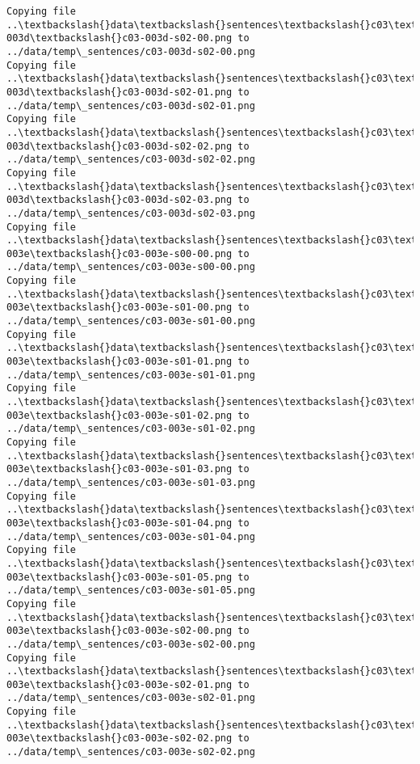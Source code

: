 \documentclass[11pt]{article}
\begin{document}
\begin{Verbatim}[commandchars=\\\{\}]
Copying file ..\textbackslash{}data\textbackslash{}sentences\textbackslash{}c03\textbackslash{}c03-003d\textbackslash{}c03-003d-s02-00.png to
../data/temp\_sentences/c03-003d-s02-00.png
Copying file ..\textbackslash{}data\textbackslash{}sentences\textbackslash{}c03\textbackslash{}c03-003d\textbackslash{}c03-003d-s02-01.png to
../data/temp\_sentences/c03-003d-s02-01.png
Copying file ..\textbackslash{}data\textbackslash{}sentences\textbackslash{}c03\textbackslash{}c03-003d\textbackslash{}c03-003d-s02-02.png to
../data/temp\_sentences/c03-003d-s02-02.png
Copying file ..\textbackslash{}data\textbackslash{}sentences\textbackslash{}c03\textbackslash{}c03-003d\textbackslash{}c03-003d-s02-03.png to
../data/temp\_sentences/c03-003d-s02-03.png
Copying file ..\textbackslash{}data\textbackslash{}sentences\textbackslash{}c03\textbackslash{}c03-003e\textbackslash{}c03-003e-s00-00.png to
../data/temp\_sentences/c03-003e-s00-00.png
Copying file ..\textbackslash{}data\textbackslash{}sentences\textbackslash{}c03\textbackslash{}c03-003e\textbackslash{}c03-003e-s01-00.png to
../data/temp\_sentences/c03-003e-s01-00.png
Copying file ..\textbackslash{}data\textbackslash{}sentences\textbackslash{}c03\textbackslash{}c03-003e\textbackslash{}c03-003e-s01-01.png to
../data/temp\_sentences/c03-003e-s01-01.png
Copying file ..\textbackslash{}data\textbackslash{}sentences\textbackslash{}c03\textbackslash{}c03-003e\textbackslash{}c03-003e-s01-02.png to
../data/temp\_sentences/c03-003e-s01-02.png
Copying file ..\textbackslash{}data\textbackslash{}sentences\textbackslash{}c03\textbackslash{}c03-003e\textbackslash{}c03-003e-s01-03.png to
../data/temp\_sentences/c03-003e-s01-03.png
Copying file ..\textbackslash{}data\textbackslash{}sentences\textbackslash{}c03\textbackslash{}c03-003e\textbackslash{}c03-003e-s01-04.png to
../data/temp\_sentences/c03-003e-s01-04.png
Copying file ..\textbackslash{}data\textbackslash{}sentences\textbackslash{}c03\textbackslash{}c03-003e\textbackslash{}c03-003e-s01-05.png to
../data/temp\_sentences/c03-003e-s01-05.png
Copying file ..\textbackslash{}data\textbackslash{}sentences\textbackslash{}c03\textbackslash{}c03-003e\textbackslash{}c03-003e-s02-00.png to
../data/temp\_sentences/c03-003e-s02-00.png
Copying file ..\textbackslash{}data\textbackslash{}sentences\textbackslash{}c03\textbackslash{}c03-003e\textbackslash{}c03-003e-s02-01.png to
../data/temp\_sentences/c03-003e-s02-01.png
Copying file ..\textbackslash{}data\textbackslash{}sentences\textbackslash{}c03\textbackslash{}c03-003e\textbackslash{}c03-003e-s02-02.png to
../data/temp\_sentences/c03-003e-s02-02.png

\end{Verbatim}
\end{document}
